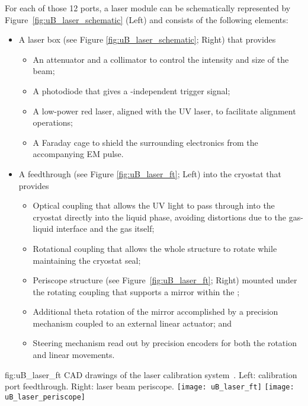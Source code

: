 For each of those \num{12} ports, a laser module can be schematically represented by Figure~\ref{fig:uB_laser_schematic} (Left) and consists of the following elements:
\begin{itemize}
    \item A laser box (see Figure \ref{fig:uB_laser_schematic}; Right) that provides
    \begin{itemize}
        \item An attenuator and a collimator to control the intensity and size of the beam;
        \item A photodiode that gives a -independent trigger signal;
        \item A low-power red laser, aligned with the UV laser, to facilitate alignment operations;
        \item A Faraday cage to shield the surrounding electronics from the accompanying EM pulse.
    \end{itemize}
    \item A feedthrough (see Figure \ref{fig:uB_laser_ft}; Left) into the cryostat that provides
    \begin{itemize}
        \item Optical coupling that allows the UV light to pass through into the cryostat directly into the liquid phase, avoiding distortions due to the gas-liquid interface and the gas itself;
        \item Rotational coupling that allows the whole structure to rotate while maintaining the cryostat seal;
        \item Periscope structure (see Figure~\ref{fig:uB_laser_ft}; Right) mounted under the rotating coupling that supports a mirror within the ;
        \item Additional theta rotation of the mirror accomplished by a precision mechanism coupled to an external linear actuator; and
        \item Steering mechanism read out by precision encoders for both the rotation and linear movements.
    \end{itemize}
    
\end{itemize}


\begin{dunefigure}{fig:uB_laser_ft}
{CAD drawings of the  laser calibration system~\cite{microboone}. Left: calibration port feedthrough. Right: laser beam periscope. %
}
\texttt{[image: uB\_laser\_ft]}
\texttt{[image: uB\_laser\_periscope]}
\end{dunefigure}

